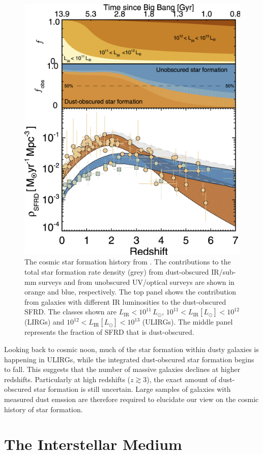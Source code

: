 \begin{figure}
    \centering
	\includegraphics[width=0.75\columnwidth]{Figures/cosmic_sfrd.pdf}
	\caption{The cosmic star formation history from \citealt{Zavala_2021}. The contributions to the total star formation rate density (grey) from dust-obscured IR/sub-mm surveys and from unobscured UV/optical surveys are shown in orange and blue, respectively. The top panel shows the contribution from galaxies with different IR luminosities to the dust-obscured SFRD. The classes shown are $L_\textrm{IR} < 10^{11}\,L_\odot$, $10^{11} < L_\textrm{IR} [L_\odot] < 10^{12}$ (LIRGs) and $10^{12} < L_\textrm{IR} [L_\odot] < 10^{13}$ (ULIRGs). The middle panel represents the fraction of SFRD that is dust-obscured.}
	\label{fig:cosmic_sfrd}
\end{figure}

Looking back to cosmic noon, much of the star formation within dusty galaxies is happening in ULIRGs, while the integrated dust-obscured star formation begins to fall. This suggests that the number of massive galaxies declines at higher redshifts. Particularly at high redshifts ($z \gtrsim 3$), the exact amount of dust-obscured star formation is still uncertain. Large samples of galaxies with measured dust emssion are therefore required to elucidate our view on the cosmic history of star formation.

\section{The Interstellar Medium}

